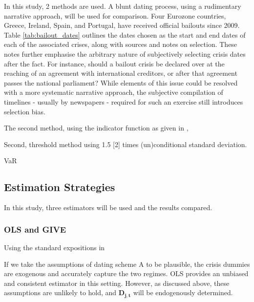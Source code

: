 \documentclass[../base.tex]{subfiles}
\begin{document}
In this study, 2 methods are used. A blunt dating process, using a rudimentary narrative approach, will be used for comparison. Four Eurozone countries, Greece, Ireland, Spain, and Portugal, have received official bailouts since 2009. Table \ref{tab:bailout_dates} outlines the dates chosen as the start and end dates of each of the associated crises, along with sources and notes on selection. These notes further emphasise the arbitrary nature of subjectively selecting crisis dates after the fact. For instance, should a bailout crisis be declared over at the reaching of an agreement with international creditors, or after that agreement passes the national parliament? While elements of this issue could be resolved with a more systematic narrative approach, the subjective compilation of timelines - usually by newspapers - required for such an exercise still introduces selection bias. 

The second method, using the indicator function as given in \cite{pesaran2007econometric}, 

 Second, threshold method using 1.5 [2] times (un)conditional standard deviation. 


\cite{metiu2012sovereign} VaR



\subsection{Estimation Strategies}

In this study, three estimators will be used and the results compared. 

\subsubsection{OLS and GIVE}

Using the standard expositions in 

If we take the assumptions of dating scheme A to be plausible, the crisis dummies are exogenous and accurately capture the two regimes. OLS provides an unbiased and consistent estimator in this setting. However, as discussed above, these assumptions are unlikely to hold, and $\mathbf{D_{j,t}}$ will be endogenously determined. 
\end{document}
